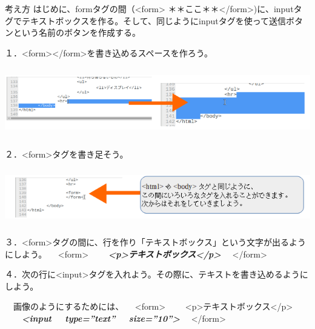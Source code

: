 \documentclass[a4paper,12pt,dvipdfmx]{jarticle}
\begin{document}
考え方\newline
はじめに、formタグの間（{\textless}form{\textgreater}
＊＊ここ＊＊{\textless}/form{\textgreater})に、inputタグでテキストボックスを作る。そして、同じようにinputタグを使って送信ボタンという名前のボタンを作成する。

１．{\textless}form{\textgreater}{\textless}/form{\textgreater}を書き込めるスペースを作ろう。



\centering
\includegraphics[width=17.006cm,height=3.046cm]{ome7-img035.png}
\flushleft

２．{\textless}form{\textgreater}タグを書き足そう。



\centering
\includegraphics[width=17.006cm,height=2.454cm]{ome7-img036.png}
\flushleft


\bigskip


\bigskip

３．{\textless}form{\textgreater}タグの間に、行を作り「テキストボックス」という文字が出るようにしよう。\newline
\ \ {\textless}form{\textgreater}\newline
\ \ \ \ \textbf{\textit{{\textless}p{\textgreater}テキストボックス{\textless}/p{\textgreater}}}\newline
\ \ {\textless}/form{\textgreater}

４．次の行に{\textless}input{\textgreater}タグを入れよう。その際に、テキストを書き込めるようにしよう。

\ \ 画像のようにするためには、\newline
\ \ {\textless}form{\textgreater}\newline
\ \ \ \ {\textless}p{\textgreater}テキストボックス{\textless}/p{\textgreater}\newline
\ \ \ \ \textbf{\textit{{\textless}input \ \ type=”text” \ \ size=”10”{\textgreater}}}\newline
\ \ {\textless}/form{\textgreater}
\end{document}
